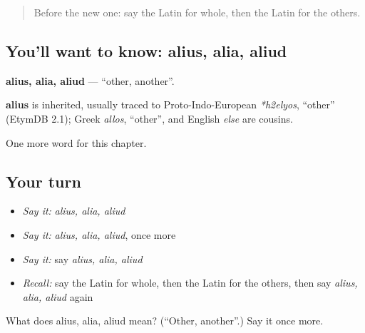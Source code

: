 \label{lesson:LA-C242-alius}



\begin{quote}
Before the new one: say the Latin for whole, then the Latin for the others.
\end{quote}

\subsection*{You'll want to know: alius, alia, aliud}
\textbf{alius, alia, aliud} — \textquotedblleft{}other, another\textquotedblright{}.

\begin{cousinweb}
\textbf{alius} is inherited, usually traced to Proto-Indo-European \emph{*h2elyos}, \textquotedblleft{}other\textquotedblright{} (EtymDB 2.1); Greek \emph{allos}, \textquotedblleft{}other\textquotedblright{}, and English \emph{else} are cousins.
\end{cousinweb}

\begin{grammarlens}[title={What you've built}]
One more word for this chapter.
\end{grammarlens}

\subsection*{Your turn}
\begin{itemize}
\raggedright
  \item \emph{Say it:} \emph{alius, alia, aliud}
  \item \emph{Say it:} \emph{alius, alia, aliud}, once more
  \item \emph{Say it:} say \emph{alius, alia, aliud}
  \item \emph{Recall:} say the Latin for whole, then the Latin for the others, then say \emph{alius, alia, aliud} again
\end{itemize}

\begin{tcolorbox}[breakable,colback=teal!4,colframe=teal!35!black,title={Before you move on}]
What does alius, alia, aliud mean? (\textquotedblleft{}Other, another\textquotedblright{}.) Say it once more.
\end{tcolorbox}
